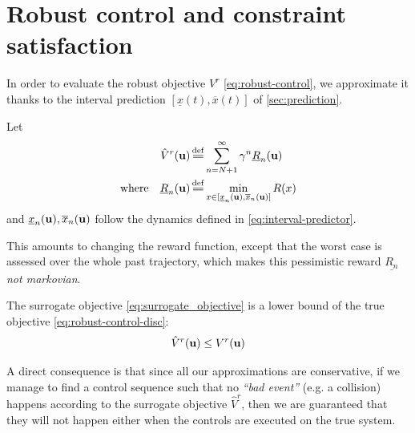 \section{Robust control and constraint satisfaction}


\label{sec:control}
In order to evaluate the robust objective $V^r$ \eqref{eq:robust-control}, we approximate it thanks to the interval prediction $[\underline{x}(t), \overline{x}(t)]$ of \autoref{sec:prediction}.

\begin{definition}
	\begin{leftbar}[defnbar]
	Let
	\begin{align}
	\label{eq:surrogate_objective} 
	\hat{V}^r(\bu) &\eqdef \sum_{n=N+1}^\infty \gamma^n \underline{R}_n(\bu)\\ 
	\text{where}\quad\underline{R}_n(\bu) &\eqdef \min_{x\in[\underline{x}_n(\bu), \overline{x}_n(\bu)]}  R(x) \label{eq:pessimistic-rewards}
	\end{align}
	and $\underline{x}_n(\mathbf{u}), \overline{x}_n(\mathbf{u})$ follow the dynamics defined in \eqref{eq:interval-predictor}.
	\end{leftbar}
\end{definition}

This amounts to changing the reward function, except that the worst case is assessed over the whole past trajectory, which makes this pessimistic reward $\underline{R_n}$ \emph{not markovian}.

\begin{proposition}
	\label{prop:lower-bound}
	\begin{leftbar}[propositionbar]
	The surrogate objective  \eqref{eq:surrogate_objective} is a lower bound of the true objective  \eqref{eq:robust-control-disc}: 
	\begin{equation*}
	\hat{V}^r(\mathbf{u}) \leq V^r(\mathbf{u})
	\end{equation*}
	\end{leftbar}
\end{proposition}
A direct consequence is that since all our approximations are conservative, if we manage to find a control sequence such that no \textit{``bad event''} (e.g. a collision) happens according to the surrogate objective $\hat{V}^r$, then we are guaranteed that they will not happen either when the controls are executed on the true system. 

